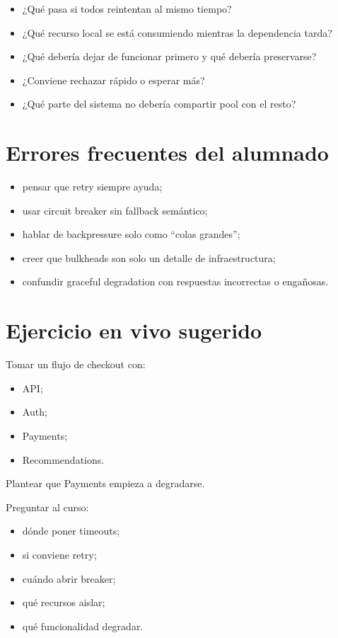 \documentclass[variant=docente,cover=institutional,mode=screen]{ua-engineering-v6-article}
\begin{document}
\begin{itemize}
\item ¿Qué pasa si todos reintentan al mismo tiempo?
\item ¿Qué recurso local se está consumiendo mientras la dependencia tarda?
\item ¿Qué debería dejar de funcionar primero y qué debería preservarse?
\item ¿Conviene rechazar rápido o esperar más?
\item ¿Qué parte del sistema no debería compartir pool con el resto?
\end{itemize}

\section{Errores frecuentes del alumnado}

\begin{itemize}
\item pensar que retry siempre ayuda;
\item usar circuit breaker sin fallback semántico;
\item hablar de backpressure solo como “colas grandes”;
\item creer que bulkheads son solo un detalle de infraestructura;
\item confundir graceful degradation con respuestas incorrectas o engañosas.
\end{itemize}

\section{Ejercicio en vivo sugerido}

Tomar un flujo de checkout con:
\begin{itemize}
\item API;
\item Auth;
\item Payments;
\item Recommendations.
\end{itemize}

Plantear que Payments empieza a degradarse.

Preguntar al curso:
\begin{itemize}
\item dónde poner timeouts;
\item si conviene retry;
\item cuándo abrir breaker;
\item qué recursos aislar;
\item qué funcionalidad degradar.
\end{itemize}
\end{document}
